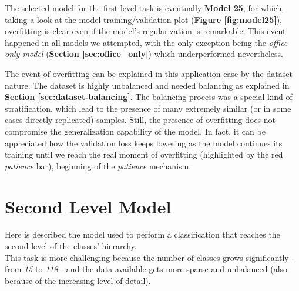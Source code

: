 \documentclass[12pt]{article}
\begin{document}
The selected model for the first level task is eventually \textbf{Model 25}, for which, taking a look at the model training/validation plot (\hyperref[fig:model25]{\textbf{Figure \ref{fig:model25}}}), overfitting is clear even if the model's regularization is remarkable. This event happened in all models we attempted, with the only exception being the \textit{office only model} (\hyperref[sec:office_only]{\textbf{Section \ref{sec:office_only}}}) which underperformed nevertheless. 

The event of overfitting can be explained in this application case by the dataset nature. The dataset is highly unbalanced and needed balancing as explained in \hyperref[sec:dataset-balancing]{\textbf{Section \ref{sec:dataset-balancing}}}. The balancing process was a special kind of stratification, which lead to the presence of many extremely similar (or in some cases directly replicated) samples. Still, the presence of overfitting does not compromise the generalization capability of the model. In fact, it can be appreciated how the validation loss keeps lowering as the model continues its training until we reach the real moment of overfitting (highlighted by the red \textit{patience} bar), beginning of the \textit{patience} mechanism.

\section{Second Level Model}\label{sec:2lev-model}
Here is described the model used to perform a classification that reaches the second level of the classes' hierarchy.\\
This task is more challenging because the number of classes grows significantly - from \textit{15} to \textit{118} - and the data available gets more sparse and unbalanced (also because of the increasing level of detail).
\end{document}
